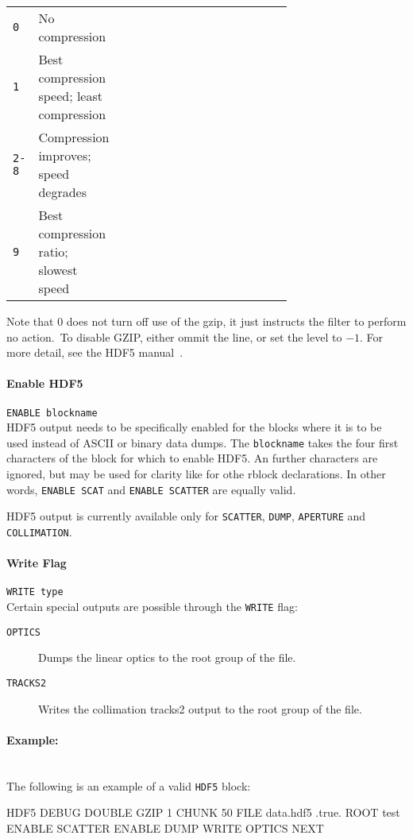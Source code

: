 \bigskip
\begin{tabular}{@{}llp{0.7\linewidth}}
    \texttt{0}   & No compression \\
    \texttt{1}   & Best compression speed; least compression \\
    \texttt{2-8} & Compression improves; speed degrades \\
    \texttt{9}   & Best compression ratio; slowest speed
\end{tabular}

\bigskip
Note that $0$ does not turn off use of the gzip, it just instructs the filter to perform no action.\
To disable GZIP, either ommit the line, or set the level to $-1$.
For more detail, see the HDF5 manual~\cite{h5_doc}.

\paragraph{Enable HDF5} \texttt{ENABLE blockname}\\

HDF5 output needs to be specifically enabled for the blocks where it is to be used instead of ASCII or binary data dumps.
The \texttt{blockname} takes the four first characters of the block for which to enable HDF5.
An further characters are ignored, but may be used for clarity like for othe rblock declarations.
In other words, \texttt{ENABLE SCAT} and \texttt{ENABLE SCATTER} are equally valid.

HDF5 output is currently available only for \texttt{SCATTER}, \texttt{DUMP}, \texttt{APERTURE} and \texttt{COLLIMATION}.

\paragraph{Write Flag} \texttt{WRITE type}\\

Certain special outputs are possible through the \texttt{WRITE} flag:
\begin{description}
    \item[\texttt{OPTICS}] Dumps the linear optics to the root group of the file.
    \item[\texttt{TRACKS2}] Writes the collimation tracks2 output to the root group of the file.
\end{description}

\paragraph{Example:}~\\

The following is an example of a valid \texttt{HDF5} block:

\begin{cverbatim}
HDF5
    DEBUG
    DOUBLE
    GZIP 1
    CHUNK 50
    FILE data.hdf5 .true.
    ROOT test
    ENABLE SCATTER
    ENABLE DUMP
    WRITE OPTICS
NEXT
\end{cverbatim}
